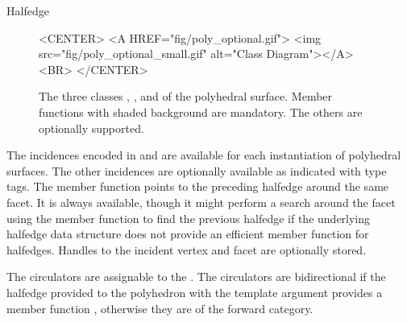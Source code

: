 \begin{ccRefClass}{Halfedge}
\begin{figure}[bht]
\begin{ccHtmlOnly}
    <CENTER>
    <A HREF="fig/poly_optional.gif">
        <img src="fig/poly_optional_small.gif" 
             alt="Class Diagram"></A><BR>
    </CENTER>
\end{ccHtmlOnly}
        \caption{The three classes \protect{}, 
          \protect{}, and 
          \protect{} of the polyhedral surface. Member
          functions with shaded background are mandatory. The others
          are optionally supported.}
        \label{figurePolyOptionalMethods}
    \end{figure}


The incidences encoded in  and  are
available for each instantiation of polyhedral surfaces.  The other
incidences are optionally available as indicated with type tags.  The
 member function points to the preceding halfedge around
the same facet. It is always available, though it might perform a
search around the facet using the  member function to find
the previous halfedge if the underlying halfedge data structure does
not provide an efficient  member function for halfedges.
Handles to the incident vertex and facet are optionally stored.

The circulators are assignable to the . The
circulators are bidirectional if the halfedge provided to the
polyhedron with the  template argument provides a member
function , otherwise they are of the forward category.



\vspace*{-1mm}
\ccTypes
{}
\ccThreeToTwo

\ccGlue
{}
\vspace*{-3mm}

\ccGlue
{}
\ccGlue
{}
\ccGlue
{}
\ccGlue
{}

\ccGlue
{}
\ccGlue
{}
\ccGlue
{}
\ccGlue
{}


\end{ccRefClass}
